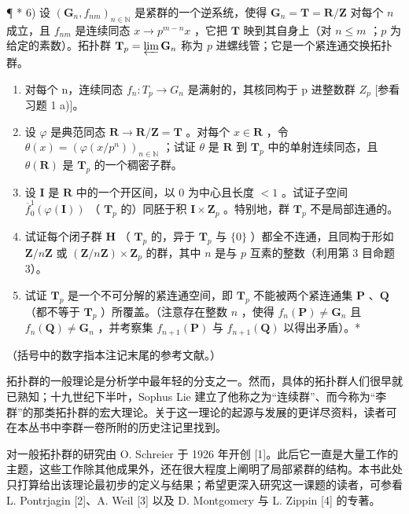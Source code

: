 ¶ * 6) 设 \((\mathbf{G}_n, f_{nm})_{n \in \mathbb{N}}\) 是紧群的一个逆系统，使得 \(\mathbf{G}_n = \mathbf{T} = \mathbf{R} / \mathbf{Z}\) 对每个 \(n\) 成立，且 \(f_{nm}\) 是连续同态 \(x \to p^{m-n}x\) ，它把 \(\mathbf{T}\) 映到其自身上（对 \(n \leqslant m\) ；\(p\) 为给定的素数）。拓扑群 \(\mathbf{T}_p = \varprojlim \mathbf{G}_n\) 称为 \(p\) 进螺线管；它是一个紧连通交换拓扑群。

\begin{enumerate}
\def\labelenumi{\alph{enumi})}
\item
  对每个 n，连续同态 \(f_{n}: T_{p} \to G_{n}\) 是满射的，其核同构于 p 进整数群 \(Z_{p}\) {[}参看习题 1 a){]}。
\item
  设 \(\varphi\) 是典范同态 \(\mathbf{R} \to \mathbf{R} / \mathbf{Z} = \mathbf{T}\) 。对每个 \(x \in \mathbf{R}\) ，令 \(\theta(x) = (\varphi(x / p^n))_{n \in \mathbb{N}}\) ；试证 \(\theta\) 是 \(\mathbf{R}\) 到 \(\mathbf{T}_p\) 中的单射连续同态，且 \(\theta(\mathbf{R})\) 是 \(\mathbf{T}_p\) 的一个稠密子群。
\item
  设 \(\mathbf{I}\) 是 \(\mathbf{R}\) 中的一个开区间，以 \(0\) 为中心且长度 \(< 1\) 。试证子空间 \(\overline{f}_{0}^{1}(\varphi(\mathbf{I}))\) （ \(\mathbf{T}_p\) 的）同胚于积 \(\mathbf{I} \times \mathbf{Z}_p\) 。特别地，群 \(\mathbf{T}_p\) 不是局部连通的。
\item
  试证每个闭子群 \(\mathbf{H}\) （ \(\mathbf{T}_p\) 的，异于 \(\mathbf{T}_p\) 与 \(\{0\}\) ）都全不连通，且同构于形如 \(\mathbf{Z}/n\mathbf{Z}\) 或 \((\mathbf{Z}/n\mathbf{Z}) \times \mathbf{Z}_p\) 的群，其中 \(n\) 是与 \(p\) 互素的整数（利用第 3 目命题 3）。
\item
  试证 \(\mathbf{T}_p\) 是一个不可分解的紧连通空间，即 \(\mathbf{T}_p\) 不能被两个紧连通集 \(\mathbf{P}\) 、\(\mathbf{Q}\) （都不等于 \(\mathbf{T}_p\) ）所覆盖。（注意存在整数 \(n\) ，使得 \(f_n(\mathbf{P}) \neq \mathbf{G}_n\) 且 \(f_n(\mathbf{Q}) \neq \mathbf{G}_n\) ，并考察集 \(f_{n+1}(\mathbf{P})\) 与 \(f_{n+1}(\mathbf{Q})\) 以得出矛盾）。*
\end{enumerate}


（括号中的数字指本注记末尾的参考文献。）

拓扑群的一般理论是分析学中最年轻的分支之一。然而，具体的拓扑群人们很早就已熟知；十九世纪下半叶，Sophus Lie 建立了他称之为“连续群”、而今称为“李群”的那类拓扑群的宏大理论。关于这一理论的起源与发展的更详尽资料，读者可在本丛书中李群一卷所附的历史注记里找到。

对一般拓扑群的研究由 O. Schreier 于 1926 年开创 {[}1{]}。此后它一直是大量工作的主题，这些工作除其他成果外，还在很大程度上阐明了局部紧群的结构。本书此处只打算给出该理论最初步的定义与结果；希望更深入研究这一课题的读者，可参看 L. Pontrjagin {[}2{]}、A. Weil {[}3{]} 以及 D. Montgomery 与 L. Zippin {[}4{]} 的专著。


